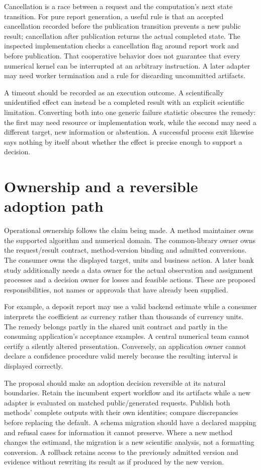Cancellation is a race between a request and the computation's next state
transition. For pure report generation, a useful rule is that an accepted
cancellation recorded before the publication transition prevents a new public
result; cancellation after
publication returns the actual completed state. The inspected implementation
checks a cancellation flag around report work and before publication. That
cooperative behavior does not guarantee that every numerical kernel can be
interrupted at an arbitrary instruction. A later adapter may need worker
termination and a rule for discarding uncommitted artifacts.

A timeout should be recorded as an execution outcome. A scientifically
unidentified effect can instead be a completed result with an explicit
scientific limitation. Converting both into one generic failure statistic
obscures the remedy: the first may need resource or implementation work, while
the second may need a different target, new information or abstention. A
successful process exit likewise says nothing by itself about whether the
effect is precise enough to support a decision.

\section{Ownership and a reversible adoption path}

Operational ownership follows the claim being made. A method maintainer owns
the supported algorithm and numerical domain. The common-library owner owns
the request/result contract, method-version binding and admitted conversions.
The consumer owns the displayed target, units and business action. A later
bank study additionally needs a data owner for the actual observation and
assignment processes and a decision owner for losses and feasible actions.
These are proposed responsibilities, not names or approvals that have already
been supplied.

For example, a deposit report may use a valid backend estimate while a
consumer interprets the coefficient as currency rather than thousands of
currency units. The remedy belongs partly in the shared unit contract and
partly in the consuming application's acceptance examples. A central
numerical team cannot certify a silently altered presentation. Conversely,
an application owner cannot declare a confidence procedure valid merely
because the resulting interval is displayed correctly.

The proposal should make an adoption decision reversible at its natural
boundaries. Retain the incumbent expert workflow and its artifacts while a
new adapter is evaluated on matched public/generated requests. Publish both
methods' complete outputs with their own identities; compare discrepancies
before replacing the default. A schema migration should have a declared
mapping and refusal cases for information it cannot preserve. Where a new
method changes the estimand, the migration is a new scientific analysis,
not a formatting conversion. A rollback retains access to the previously
admitted version and evidence without rewriting its result as if produced
by the new version.

